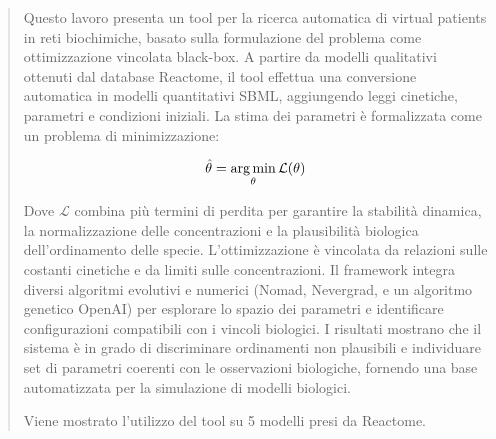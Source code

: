\begin{abstract}

Questo lavoro presenta un tool per la ricerca automatica di virtual patients in reti biochimiche, basato sulla formulazione del problema come ottimizzazione vincolata black-box.
A partire da modelli qualitativi ottenuti dal database Reactome, il tool effettua una conversione automatica in modelli quantitativi SBML, aggiungendo leggi cinetiche, parametri e condizioni iniziali.
La stima dei parametri è formalizzata come un problema di minimizzazione:

\begin{equation}
\hat{\theta} = \argmin_{\theta} \mathcal{L}(\theta)
\end{equation}

Dove $\mathcal{L}$ combina più termini di perdita per garantire la stabilità dinamica, la normalizzazione delle concentrazioni e la plausibilità biologica dell'ordinamento delle specie.
L'ottimizzazione è vincolata da relazioni sulle costanti cinetiche e da limiti sulle concentrazioni.
Il framework integra diversi algoritmi evolutivi e numerici (Nomad, Nevergrad, e un algoritmo genetico OpenAI) per esplorare lo spazio dei parametri e identificare configurazioni compatibili con i vincoli biologici.
I risultati mostrano che il sistema è in grado di discriminare ordinamenti non plausibili e individuare set di parametri coerenti con le osservazioni biologiche, fornendo una base automatizzata per la simulazione di modelli biologici.

Viene mostrato l'utilizzo del tool su 5 modelli presi da Reactome.

\end{abstract}